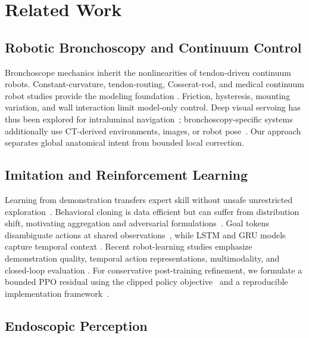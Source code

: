 \documentclass[letterpaper,10pt,conference]{ieeeconf}
\begin{document}
\section{Related Work}

\subsection{Robotic Bronchoscopy and Continuum Control}

Bronchoscope mechanics inherit the nonlinearities of tendon-driven continuum
robots. Constant-curvature, tendon-routing, Cosserat-rod, and medical continuum
robot studies provide the modeling foundation
\cite{camarillo2008mechanics,webster2010continuum,rucker2011statics,
burgner2015survey,till2019cosserat}. Friction, hysteresis, mounting variation,
and wall interaction limit model-only control. Deep visual servoing has thus
been explored for intraluminal navigation~\cite{lazo2022visualservo};
bronchoscopy-specific systems additionally use CT-derived environments, images,
or robot pose~\cite{zhang2024aicopilot,zhao2024bronchocopilot,xu2025lungdepth}.
Our approach separates global anatomical intent from bounded local correction.

\subsection{Imitation and Reinforcement Learning}

Learning from demonstration transfers expert skill without unsafe unrestricted
exploration~\cite{argall2009survey,osa2018imitation}. Behavioral cloning is
data efficient but can suffer from distribution shift, motivating aggregation
and adversarial formulations~\cite{ross2011dagger,ho2016gail}. Goal tokens
disambiguate actions at shared observations~\cite{codevilla2018conditional},
while LSTM and GRU models capture temporal context
\cite{hochreiter1997lstm,cho2014gru}. Recent robot-learning studies emphasize
demonstration quality, temporal action representations, multimodality, and
closed-loop evaluation
\cite{mandlekar2022robomimic,florence2022ibc,shafiullah2022bet,
chi2024diffusionpolicy,zhao2023act,lynch2020play,levine2016visuomotor}.
For conservative post-training refinement, we formulate a bounded PPO residual
using the clipped policy objective~\cite{schulman2017ppo} and a reproducible
implementation framework~\cite{raffin2021sb3}.

\subsection{Endoscopic Perception}
\end{document}
